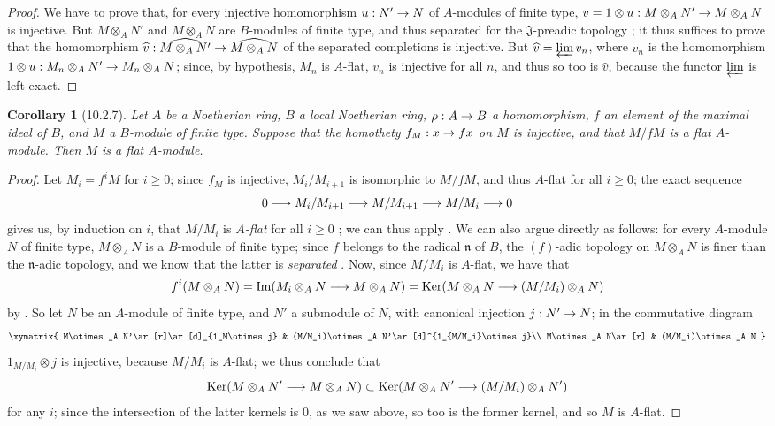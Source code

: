 \documentclass[oneside]{amsart}
\theoremstyle{ega-env-style}
\theoremstyle{ega-thm-env-style}
\newtheorem*{corollary}{Corollary}
\theoremstyle{ega-defn-env-style}
\def\geq{\geqslant}                 %
\def\Ker{\operatorname{Ker}}
\def\Im{\operatorname{Im}}
\renewcommand{\to}{\mathchoice{\longrightarrow}{\rightarrow}{\rightarrow}{\rightarrow}}
\newcommand{\oldpage}[2][]{{\marginnote{\normalfont{\textbf{#1}~|~#2}}}\ignorespaces}
\let\EGAOriginalLabel\label
\renewcommand{\label}[1]{\phantomsection\EGAOriginalLabel{#1}}
\begin{document}
\begin{proof}
We have to prove that, for every injective homomorphism $u:N'\to N$ of $A$-modules of finite type, $v=1\otimes u:M\otimes_A N'\to M\otimes_A N$ is injective.
But $M\otimes_A N'$ and $M\otimes_A N$ are $B$-modules of finite type, and thus separated for the $\mathfrak{J}$-preadic topology ;
it thus suffices to prove that the homomorphism $\widehat{v}:\widehat{M\otimes_A N'}\to\widehat{M\otimes_A N}$ of the separated completions is injective.
But $\widehat{v}=\varprojlim v_n$, where $v_n$ is the homomorphism $1\otimes u:M_n\otimes_A N'\to M_n\otimes_A N$;
since, by hypothesis, $M_n$ is $A$-flat, $v_n$ is injective for all $n$, and thus so too is $\widehat{v}$, because the functor $\varprojlim$ is left exact.
\end{proof}

\begin{corollary}[10.2.7]
\label{0.10.2.7}
Let $A$ be a Noetherian ring, $B$ a local Noetherian ring, $\rho:A\to B$ a homomorphism, $f$ an element of the maximal ideal of $B$, and $M$ a $B$-module of finite type.
Suppose that the homothety $f_M:x\to fx$ on $M$ is injective, and that $M/fM$ is a flat $A$-module.
Then $M$ is a flat $A$-module.
\end{corollary}

\begin{proof}
Let $M_i=f^iM$ for $i\geq0$;
since $f_M$ is injective, $M_i/M_{i+1}$ is isomorphic to $M/fM$, and thus $A$-flat for all $i\geq0$;
the exact sequence
\[
  0\to M_i/M_{i+1}\to M/M_{i+1}\to M/M_i\to 0
\]
gives us, by induction on $i$, that $M/M_i$ is \emph{$A$-flat} for all $i\geq0$ ;
we can thus apply .
We can also argue directly as follows:
for every $A$-module $N$ of finite type, $M\otimes_A N$ is a $B$-module of finite type;
since $f$ belongs to the radical $\mathfrak{n}$ of $B$, the $(f)$-adic topology on $M\otimes_A N$ is finer than the
\oldpage[0\textsubscript{III-1}]{20}
$\mathfrak{n}$-adic topology, and we know that the latter is \emph{separated} .
Now, since $M/M_i$ is $A$-flat, we have that
\[
  f^i(M\otimes_A N)=\Im(M_i\otimes_A N\to M\otimes_A N)=\Ker(M\otimes_A N\to(M/M_i)\otimes_A N)
\]
by .
So let $N$ be an $A$-module of finite type, and $N'$ a submodule of $N$, with canonical injection $j:N'\to N$; in the commutative diagram
\[
  \xymatrix{
    M\otimes_A N'\ar[r]\ar[d]_{1_M\otimes j} &
    (M/M_i)\otimes_A N'\ar[d]^{1_{M/M_i}\otimes j}\\
    M\otimes_A N\ar[r] &
    (M/M_i)\otimes_A N
  }
\]
$1_{M/M_i}\otimes j$ is injective, because $M/M_i$ is $A$-flat; we thus conclude that
\[
  \Ker(M\otimes_A N'\to M\otimes_A N)\subset\Ker(M\otimes_A N'\to(M/M_i)\otimes_A N')
\]
for any $i$; since the intersection of the latter kernels is $0$, as we saw above, so too is the former kernel, and so $M$ is $A$-flat.
\end{proof}
\end{document}
